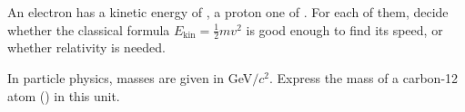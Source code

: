 \begin{abcliste}
\abc An electron has a kinetic energy of \EeO, a proton one of \EpO. For each of them, decide whether the classical formula $E_\mathrm{kin} = \frac{1}{2} m v^2$ is good enough to find its speed, or whether relativity is needed.

\abc In particle physics, masses are given in \si{\giga\electronvolt}$/c^2$. Express the mass of a carbon-12 atom (\mCO) in this unit.
\end{abcliste}
